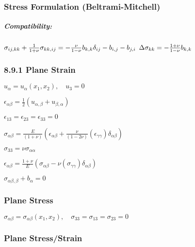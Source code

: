 \hypertarget{stress-formulation-beltrami-mitchell}{%
\subsubsection{Stress Formulation
(Beltrami-Mitchell)}\label{stress-formulation-beltrami-mitchell}}

\hypertarget{compatibility-1}{%
\subparagraph{Compatibility:}\label{compatibility-1}}

\(\sigma_{i j, k k}+\frac{1}{1+\nu} \sigma_{k k, i j}=-\frac{\nu}{1-\nu} b_{k, k} \delta_{i j}-b_{i, j}-b_{j, i}\\\)
\(\Delta \sigma_{k k}=-\frac{1+\nu}{1-\nu} b_{k, k}\\\)

\hypertarget{plane-strain}{%
\subsubsection{8.9.1 Plane Strain}\label{plane-strain}}

\(u_{\alpha}=u_{\alpha}\left(x_{1}, x_{2}\right), \quad u_{3}=0\)

\(\epsilon_{\alpha \beta}=\frac{1}{2}\left(u_{\alpha, \beta}+u_{\beta, \alpha}\right)\)

\(\epsilon_{13}=\epsilon_{23}=\epsilon_{33}=0\)

\(\sigma_{\alpha \beta}=\frac{E}{(1+\nu)}\left(\epsilon_{\alpha \beta}+\frac{\nu}{(1-2 \nu)}\left(\epsilon_{\gamma \gamma}\right) \delta_{\alpha \beta}\right)\)

\(\sigma_{33}=\nu \sigma_{\alpha \alpha}\)

\(\epsilon_{\alpha \beta}=\frac{1+\nu}{E}\left(\sigma_{\alpha \beta}-\nu\left(\sigma_{\gamma \gamma}\right) \delta_{\alpha \beta}\right)\)

\(\sigma_{\alpha \beta, \beta}+b_{\alpha}=0\)

\hypertarget{plane-stress}{%
\subsubsection{Plane Stress}\label{plane-stress}}

\(\sigma_{\alpha \beta}=\sigma_{\alpha \beta}\left(x_{1}, x_{2}\right), \quad \sigma_{33}=\sigma_{13}=\sigma_{23}=0\)

\hypertarget{plane-stressstrain}{%
\subsubsection{Plane Stress/Strain}\label{plane-stressstrain}}

